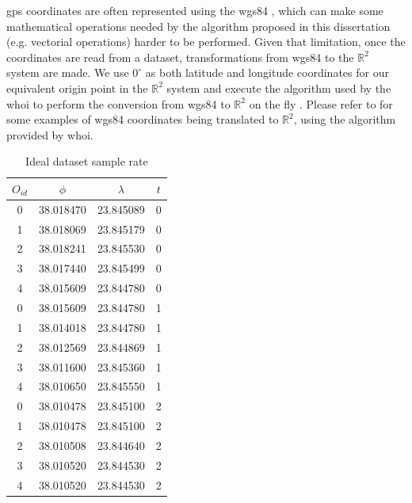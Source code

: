 \ac{gps} coordinates are often represented using the \ac{wgs84} \citep{wgs84}, which can make some mathematical
operations needed by the algorithm proposed in this dissertation (e.g. vectorial operations) harder to be performed.
Given that limitation, once the coordinates are read from a dataset, transformations from \ac{wgs84} to the
$\mathbb{R}^2$ system are made. We use $0^\circ$ as both latitude and longitude coordinates for our equivalent origin
point in the $\mathbb{R}^2$ system and execute the algorithm used by the \ac{whoi} to perform the conversion from
\ac{wgs84} to $\mathbb{R}^2$ on the fly \citep{latlogtoxy}. Please refer to  for some examples
of \ac{wgs84} coordinates being translated to $\mathbb{R}^2$, using the algorithm provided by \ac{whoi}.

\begin{table}[h!]
    \centering
    \begin{minipage}{0.5\textwidth}
        \centering
        \caption{Ideal dataset sample rate}
        \label{tbl:ideal_rate}
        \begin{tabular}{c c c c}
            \toprule
            \textbf{$O_{id}$} & \textbf{$\phi$} & \textbf{$\lambda$} & \textbf{$t$} \\
            \toprule
            0 & 38.018470 & 23.845089 & 0 \\
            1 & 38.018069 & 23.845179 & 0 \\
            2 & 38.018241 & 23.845530 & 0 \\
            3 & 38.017440 & 23.845499 & 0 \\
            4 & 38.015609 & 23.844780 & 0 \\
            \bottomrule
            0 & 38.015609 & 23.844780 & 1 \\
            1 & 38.014018 & 23.844780 & 1 \\
            2 & 38.012569 & 23.844869 & 1 \\
            3 & 38.011600 & 23.845360 & 1 \\
            4 & 38.010650 & 23.845550 & 1 \\
            \bottomrule
            0 & 38.010478 & 23.845100 & 2 \\
            1 & 38.010478 & 23.845100 & 2 \\
            2 & 38.010508 & 23.844640 & 2 \\
            3 & 38.010520 & 23.844530 & 2 \\
            4 & 38.010520 & 23.844530 & 2 \\

\end{tabular}
\end{minipage}
\end{table}

